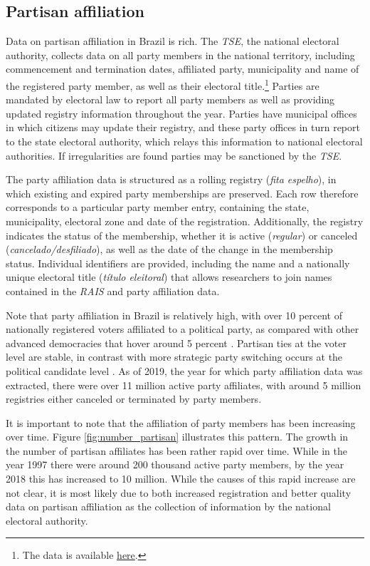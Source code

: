 \subsection{Partisan affiliation}

Data on partisan affiliation in Brazil is rich. The \emph{TSE}, the national electoral authority, collects data on all party members in the national territory, including commencement and termination dates, affiliated party, municipality and name of the registered party member, as well as their electoral title.\footnote{The data is available \href{https://filia-consulta.tse.jus.br/}{here}.} Parties are mandated by electoral law to report all party members as well as providing updated registry information throughout the year. Parties have municipal offices in which citizens may update their registry, and these party offices in turn report to the state electoral authority, which relays this information to national electoral authorities. If irregularities are found parties may be sanctioned by the \emph{TSE}.

The party affiliation data is structured as a rolling registry (\emph{fita espelho}), in which existing and expired party memberships are preserved. Each row therefore corresponds to a particular party member entry, containing the state, municipality, electoral zone and date of the registration. Additionally, the registry indicates the status of the membership, whether it is active (\emph{regular}) or canceled (\emph{cancelado/desfiliado}), as well as the date of the change in the membership status. Individual identifiers are provided, including the name and a nationally unique electoral title (\emph{t\'{i}tulo eleitoral}) that allows researchers to join names contained in the \emph{RAIS} and party affiliation data.

Note that party affiliation in Brazil is relatively high, with over 10 percent of nationally registered voters affiliated to a political party, as compared with other advanced democracies that hover around 5 percent \citep{speck2015estudo}. Partisan ties at the voter level are stable, in contrast with more strategic party switching occurs at the political candidate level \citep{desposato2006parties}. As of 2019, the year for which party affiliation data was extracted, there were over 11 million active party affiliates, with around 5 million registries either canceled or terminated by party members.

It is important to note that the affiliation of party members has been increasing over time. Figure \ref{fig:number_partisan} illustrates this pattern. The growth in the number of partisan affiliates has been rather rapid over time. While in the year 1997 there were around 200 thousand active party members, by the year 2018 this has increased to 10 million. While the causes of this rapid increase are not clear, it is most likely due to both increased registration and better quality data on partisan affiliation as the collection of information by the national electoral authority.

